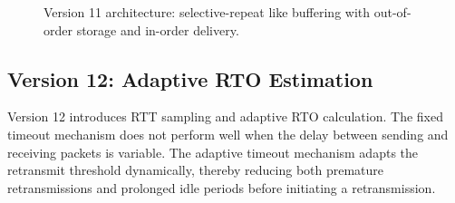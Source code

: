 \begin{figure}[h!]
{%
}
\caption{Version 11 architecture: selective-repeat like buffering with out-of-order storage and in-order delivery.
}
\label{fig:v11-architecture}
\end{figure}

\clearpage
\subsection{Version 12: Adaptive RTO Estimation}
Version 12 introduces RTT sampling and adaptive RTO calculation. The fixed timeout mechanism does not perform well when the delay between sending and receiving packets is variable. The adaptive timeout mechanism adapts the retransmit threshold dynamically, thereby reducing both premature retransmissions and prolonged idle periods before initiating a retransmission.

